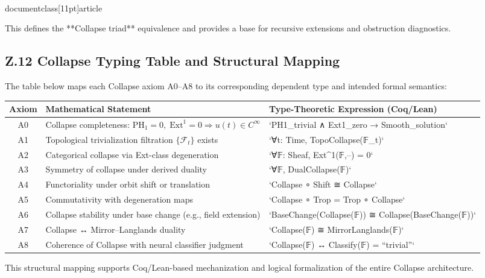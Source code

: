 \\documentclass[11pt]{article}
\begin{document}
This defines the **Collapse triad** equivalence and provides a base for recursive extensions and obstruction diagnostics.


\subsection*{Z.12 Collapse Typing Table and Structural Mapping}

The table below maps each Collapse axiom A0–A8 to its corresponding dependent type and intended formal semantics:

\begin{center}
\renewcommand{\arraystretch}{1.3}
\begin{tabular}{|c|p{7cm}|p{5.5cm}|}
\hline
\textbf{Axiom} & \textbf{Mathematical Statement} & \textbf{Type-Theoretic Expression (Coq/Lean)} \\
\hline
A0 & Collapse completeness: \( \mathrm{PH}_1 = 0, \; \mathrm{Ext}^1 = 0 \Rightarrow u(t) \in C^\infty \) & `PH1_trivial ∧ Ext1_zero → Smooth_solution` \\
A1 & Topological trivialization filtration \( \{\mathcal{F}_t\} \) exists & `∀t: Time, TopoCollapse(𝔽_t)` \\
A2 & Categorical collapse via Ext-class degeneration & `∀𝔽: Sheaf, Ext^1(𝔽,–) = 0` \\
A3 & Symmetry of collapse under derived duality & `∀𝔽, DualCollapse(𝔽)` \\
A4 & Functoriality under orbit shift or translation & `Collapse ∘ Shift ≅ Collapse` \\
A5 & Commutativity with degeneration maps & `Collapse ∘ Trop = Trop ∘ Collapse` \\
A6 & Collapse stability under base change (e.g., field extension) & `BaseChange(Collapse(𝔽)) ≅ Collapse(BaseChange(𝔽))` \\
A7 & Collapse ↔ Mirror–Langlands duality & `Collapse(𝔽) ≅ MirrorLanglands(𝔽)` \\
A8 & Coherence of Collapse with neural classifier judgment & `Collapse(𝔽) ↔ Classify(𝔽) = “trivial”` \\
\hline
\end{tabular}
\end{center}

This structural mapping supports Coq/Lean-based mechanization and logical formalization of the entire Collapse architecture.
\end{document}
